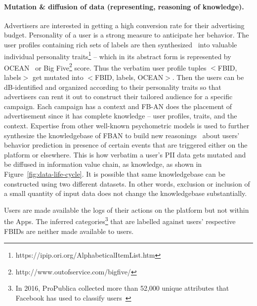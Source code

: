 \documentclass[a4paper,twoside]{article}
\begin{document}
\paragraph{Mutation \& diffusion of data (representing, reasoning of
  knowledge).} Advertisers are interested in getting a high conversion
rate for their advertising budget. Personality of a user is a strong
measure to anticipate her behavior. The user profiles containing rich
sets of labels are then
synthesized~\cite{kosinski-youyou,kosinski-likes} into valuable
individual personality
traits\footnote{https://ipip.ori.org/AlphabeticalItemList.htm} --
which in its abstract form is represented by OCEAN~\cite{ocean-costa}
or Big Five\footnote{http://www.outofservice.com/bigfive/} score. Thus
the verbatim user profile tuples $<$FBID, labels$>$ get mutated into
$<$FBID, labels, OCEAN$>$. Then the users can be dB-identified and
organized according to their personality traits so that advertisers
can rent it out to construct their tailored audience for a specific
campaign. Each campaign has a context and FB-AN does the placement of
advertisement since it has complete knowledge -- user profiles,
traits, and the context. Expertise from other well-known psychometric
models is used to further synthesize the knowledgebase of FBAN to build
new reasonings~\cite{parsinomious} about users' behavior prediction in
presence of certain events that are triggered either on the platform
or elsewhere.  This is how verbatim a user's PII data gets mutated and
be diffused in information value chain, as knowledge, as shown in
Figure~\ref{fig:data-life-cycle}. It is possible that same
knowledgebase can be constructed using two different datasets. In
other words, exclusion or inclusion of a small quantity of input data
does not change the knowledgebase substantially.

Users are made available the logs of their actions on the platform but
not within the Apps. The inferred categories\footnote{In 2016,
  ProPublica collected more than 52,000 unique attributes that
  Facebook has used to classify users~\cite{fb-ad-categories}} that
are labelled against users' respective FBIDs are neither made
available to users.
\end{document}
